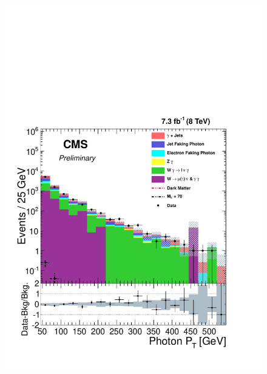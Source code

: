 \begin{figure}[!hp]
\centering
{\label{fig:leptonPt}\includegraphics[scale=0.4]{analysis_figs/lepton_pt.pdf}}

\end{figure}
